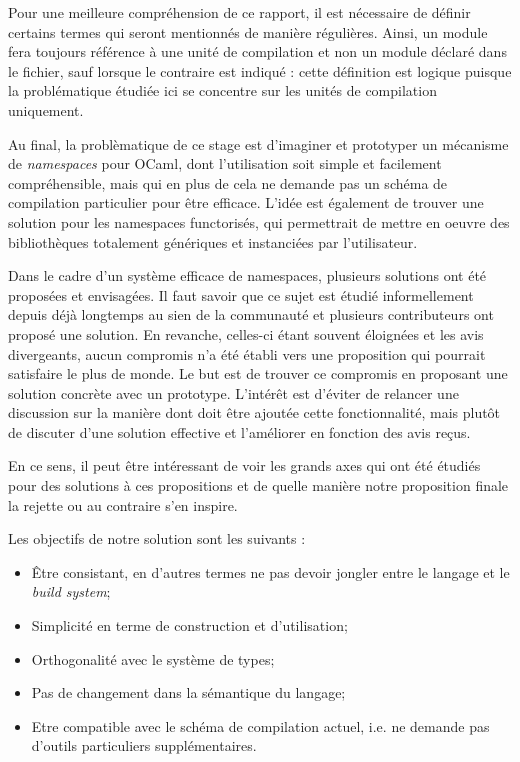 \documentclass[11pt,a4paper]{report}
\begin{document}
Pour une meilleure compréhension de ce rapport, il est nécessaire de définir
certains termes qui seront mentionnés de manière régulières. Ainsi, un module
fera toujours référence à une unité de compilation et non un module déclaré dans
le fichier, sauf lorsque le contraire est indiqué : cette définition est logique
puisque la problématique étudiée ici se concentre sur les unités de compilation
uniquement. 


\medskip

Au final, la problèmatique de ce stage est d'imaginer et prototyper un mécanisme
de \emph{namespaces} pour OCaml, dont l'utilisation soit simple et facilement
compréhensible, mais qui en plus de cela ne demande pas un schéma de compilation
particulier pour être efficace. L'idée est également de trouver une
solution pour les namespaces functorisés, qui permettrait de mettre en oeuvre
des bibliothèques totalement génériques et instanciées par l'utilisateur.

Dans le cadre d'un système efficace de namespaces, plusieurs solutions ont été
proposées et envisagées. Il faut savoir que ce sujet est étudié informellement
depuis déjà longtemps au sien de la communauté et plusieurs contributeurs ont
proposé une solution. En revanche, celles-ci étant souvent éloignées et les avis
divergeants, aucun compromis n'a été établi vers une proposition qui pourrait
satisfaire le plus de monde. Le but est de trouver ce compromis en proposant une
solution concrète avec un prototype. L'intérêt est d'éviter de relancer une
discussion sur la manière dont doit être ajoutée cette fonctionnalité, mais
plutôt de discuter d'une solution effective et l'améliorer en fonction des avis
reçus.

En ce sens, il peut être intéressant de voir les grands axes qui ont été étudiés
pour des solutions à ces propositions et de quelle manière notre proposition
finale la rejette ou au contraire s'en inspire.

Les objectifs de notre solution sont les suivants :
\begin{itemize}
\item \^{E}tre consistant, en d'autres termes ne pas devoir jongler entre le
  langage et le \emph{build system};
\item Simplicité en terme de construction et d'utilisation;
\item Orthogonalité avec le système de types;
\item Pas de changement dans la sémantique du langage;
\item Etre compatible avec le schéma de compilation actuel, i.e. ne demande
  pas d'outils particuliers supplémentaires.
\end{itemize}
\end{document}
